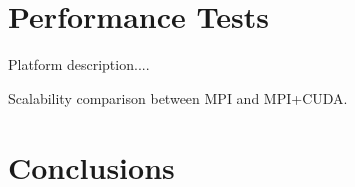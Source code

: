 \documentclass{egpubl}
\begin{document}
\section{Performance Tests}

Platform description....

Scalability comparison between MPI and MPI+CUDA.

 

\section{Conclusions}

 


%



\end{document}
